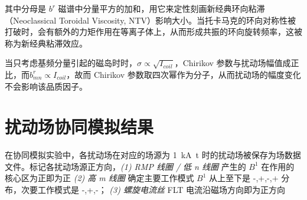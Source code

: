   
其中分母是 $b^r$ 磁谱中分量平方的加和，用它来定性刻画新经典环向粘滞（Neoclassical Toroidal Viscosity, NTV）影响大小。当托卡马克的环向对称性被打破时，会有额外的力矩作用在等离子体上，从而形成共振的环向旋转频率，这被称为新经典粘滞效应。

当只考虑基频分量引起的磁岛时时，$\sigma\propto \sqrt{I_{coil}}$，Chirikov 参数与扰动场幅值成正比，而$b^r_{mn}\propto I_{coil}$，故而 Chirikov 参数取四次幂作为分子，从而扰动场的幅度变化不会影响该品质因子。





    
  
  
    


    
  
    




\section{扰动场协同模拟结果}
在协同模拟实验中，各扰动场在对应的场源为 \SI{1}{\kilo\ampere t} 时的扰动场被保存为场数据文件。标记各扰动场源正方向，\textit{(1) RMP 线圈 / 低 n 线圈} 产生的 $B^1$ 在作用的核心区为正即为正  \textit{(2) 高 m 线圈} 确定主要工作模式 $B^1$ 从上至下是 -,+,-,+ 分布，次要工作模式是 -,+,-； \textit{(3) 螺旋电流丝} FLT 电流沿磁场方向即为正方向


